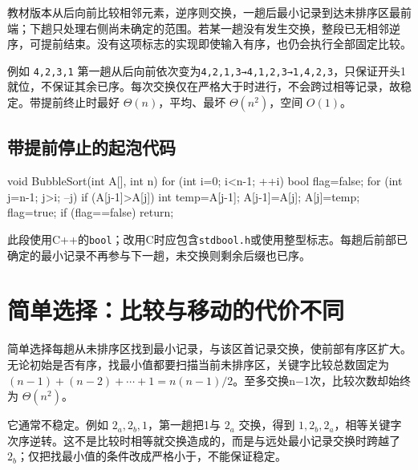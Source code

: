 教材版本从后向前比较相邻元素，逆序则交换，一趟后最小记录到达未排序区最前端；下趟只处理右侧尚未确定的范围。若某一趟没有发生交换，整段已无相邻逆序，可提前结束。没有这项标志的实现即使输入有序，也仍会执行全部固定比较。

例如 \texttt{4,\allowbreak{}2,\allowbreak{}3,\allowbreak{}1} 第一趟从后向前依次变为\texttt{4,\allowbreak{}2,\allowbreak{}1,\allowbreak{}3→4,\allowbreak{}1,\allowbreak{}2,\allowbreak{}3→1,\allowbreak{}4,\allowbreak{}2,\allowbreak{}3}，只保证开头1就位，不保证其余已序。每次交换仅在严格大于时进行，不会跨过相等记录，故稳定。带提前终止时最好 \(\Theta(n)\)，平均、最坏 \(\Theta(n^2)\)，空间 \(O(1)\)。

\subsection{带提前停止的起泡代码}\label{DS08-bubble-code}

\par\medskip\noindent\begin{minipage}{\linewidth}
\begin{codeblock}[language=C++]
void BubbleSort(int A[], int n) {
    for (int i=0; i<n-1; ++i) {
        bool flag=false;
        for (int j=n-1; j>i; --j)
            if (A[j-1]>A[j]) {
                int temp=A[j-1];
                A[j-1]=A[j]; A[j]=temp;
                flag=true;
            }
        if (flag==false) return;
    }
}
\end{codeblock}
\end{minipage}\par\medskip

此段使用C++的\texttt{bool}；改用C时应包含\texttt{stdbool.\allowbreak{}h}或使用整型标志。每趟后前部已确定的最小记录不再参与下一趟，未交换则剩余后缀也已序。

\section{简单选择：比较与移动的代价不同}\label{DS08-04}

简单选择每趟从未排序区找到最小记录，与该区首记录交换，使前部有序区扩大。无论初始是否有序，找最小值都要扫描当前未排序区，关键字比较总数固定为 \((n-1)+(n-2)+\cdots+1=n(n-1)/2\)。至多交换n\ensuremath{-}1次，比较次数却始终为 \(\Theta(n^2)\)。

它通常不稳定。例如 \(2_a,2_b,1\)，第一趟把1与 \(2_a\) 交换，得到 \(1,2_b,2_a\)，相等关键字次序逆转。这不是比较时相等就交换造成的，而是与远处最小记录交换时跨越了 \(2_b\)；仅把找最小值的条件改成严格小于，不能保证稳定。


